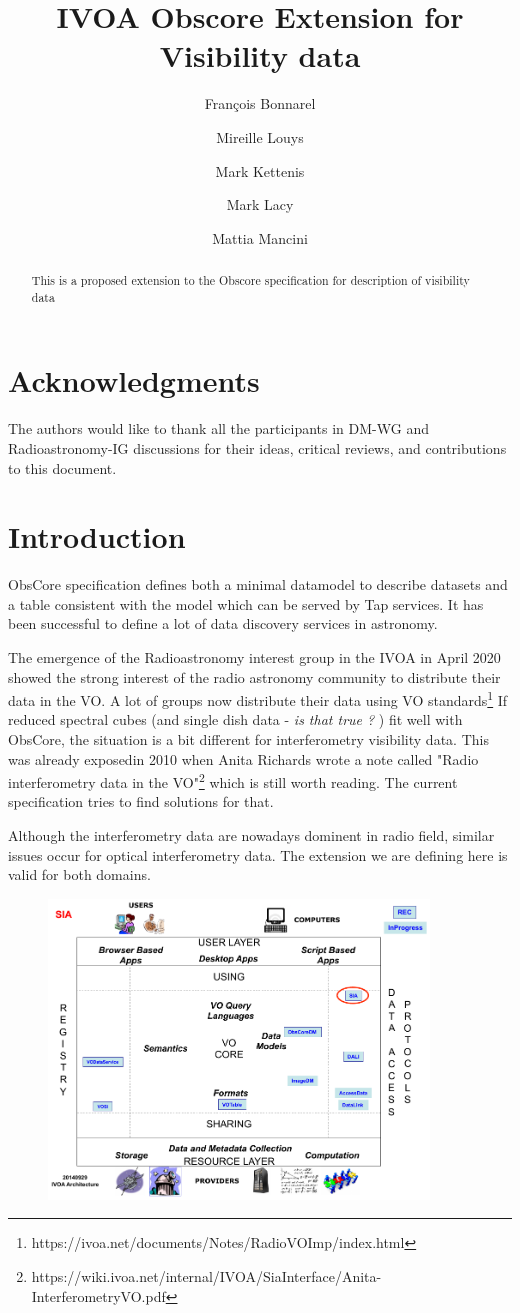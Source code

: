 \documentclass[11pt,a4paper]{ivoa}
\title{IVOA Obscore Extension for Visibility data}
\author{Fran\c cois Bonnarel}
\author{Mireille Louys}
\author{Mark Kettenis}
\author{Mark Lacy}
\author{Mattia Mancini}
\begin{document}
\begin{abstract}
	This is a proposed extension to the Obscore specification for description of visibility data
\end{abstract}

\section*{Acknowledgments}

The authors would like to thank all the participants in DM-WG and Radioastronomy-IG discussions  for their ideas, critical reviews, and contributions to this document.

\section{Introduction}
ObsCore specification \citep{std:OBSCORE} defines both a minimal datamodel to describe datasets and a table consistent with the model which can be served by Tap services. It has been successful to define a lot of data discovery services in astronomy.

The emergence of the Radioastronomy interest group in the IVOA in April 2020 showed the strong interest of the radio astronomy community to distribute their data in the VO. A lot of groups now distribute their data using VO standards\footnote{https://ivoa.net/documents/Notes/RadioVOImp/index.html} If reduced spectral cubes (and single dish data - {\it is that true ?} ) fit well with ObsCore, the situation is a bit different for interferometry visibility data. This was already exposedin 2010 when Anita Richards wrote a note called "Radio interferometry data in the VO"\footnote{https://wiki.ivoa.net/internal/IVOA/SiaInterface/Anita-InterferometryVO.pdf} which is still worth reading. The current specification tries to find solutions for that. 
 
Although the interferometry data are nowadays dominent in radio field, similar issues occur for optical interferometry data. The extension we are defining here is valid for both domains.  


\begin{figure}[H]
\centering

\includegraphics[width=0.9\textwidth]{archdiag.png}
\label{fig:architecture}
\end{figure}
\end{document}
